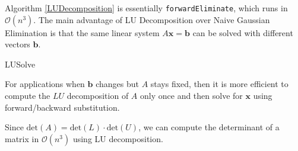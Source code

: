 \begin{rmk}
	Algorithm \ref{LUDecomposition} is essentially \texttt{forwardEliminate}, which runs in $\mathcal{O}(n^3)$. The main advantage of LU Decomposition over Naive Gaussian Elimination is that the same linear system $A \mathbf{x} = \mathbf{b}$ can be solved with different vectors $\mathbf{b}$.
\end{rmk}

\begin{algorithm}
	  \caption{LUSolve}\label{LUSolve}
\end{algorithm}

\begin{marginfigure}
	For applications when $\mathbf{b}$ changes but $A$ stays fixed, then it is more efficient to compute the $LU$ decomposition of $A$ only once and then solve for $\mathbf{x}$ using forward/backward substitution.
\end{marginfigure}

\begin{rmk}
	Since $\text{det}(A) = \text{det}(L) \cdot \text{det}(U)$, we can compute the determinant of a matrix in $\mathcal{O}(n^3)$ using LU decomposition.
\end{rmk}

